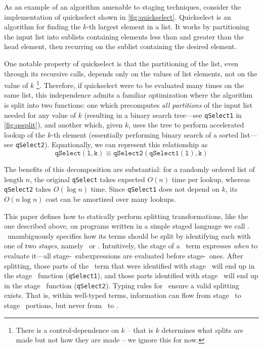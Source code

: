 As an example of an algorithm amenable to staging techniques,
consider the implementation of quickselect shown in \ref{fig:quickselect}.
Quickselect is an algorithm for finding the $k$-th largest element in a list.
It works by partitioning the input list into sublists containing elements less than and greater than the head element, 
then recurring on the sublist containing the desired element.

One notable property of quickselect is that the partitioning of the list, even through its recursive calls, depends only on the values of list elements, not on the value of $k$ 
\footnote{There is a control-dependence on $k$ -- that is $k$ determines what splits are made but not how they are made -- we ignore this for now.}.  Therefore, if quickselect were to be evaluated many times on the same list, this independence admits a familiar optimization where the algorithm is split into two functions: one which precomputes \emph{all partitions} of the input list needed for any value of $k$ (resulting in a binary search tree---see \texttt{qSelect1} in \ref{fig:qssplit}),
and another which, given $k$, uses the tree to perform accelerated lookup of the $k$-th element (essentially performing binary search of a sorted list---see \texttt{qSelect2}).  
Equationally, we can represent this relationship as 
\[
\mathtt{qSelect(l,k)} \equiv \mathtt{qSelect2(qSelect1(l),k)}
\]

The benefits of this decomposition are substantial: for a randomly ordered list of length $n$, 
the original \texttt{qSelect} takes expected $O(n)$ time per lookup, 
whereas \texttt{qSelect2} takes $O(\log n)$ time.
Since \texttt{qSelect1} does not depend on $k$, its $O(n\log n)$ cost can be amortized over many lookups.

This paper defines how to statically perform splitting transformations, like the one described above, on programs written in a simple staged language we call \lang.  \lang\ unambiguously specifies how its terms should be split
by identifying each with one of two {\em stages}, namely \bbone\ or \bbtwo.
Intuitively, the stage of a \lang\ term expresses \emph{when} to evaluate it---all stage-\bbone\
subexpressions are evaluated before stage-\bbtwo\ ones.  
After splitting, those parts of the \lang\ term that were identified with stage \bbone\ 
will end up in the stage \bbone\ function ({\tt qSelect1}), 
and those parts identified with stage \bbtwo\ will end up in the stage \bbtwo\ function ({\tt qSelect2}).
Typing rules for \lang\ ensure a valid splitting exists.  That is, 
within well-typed terms, information can flow from stage \bbone\ to stage \bbtwo\ portions,
but never from \bbtwo\ to \bbone.

